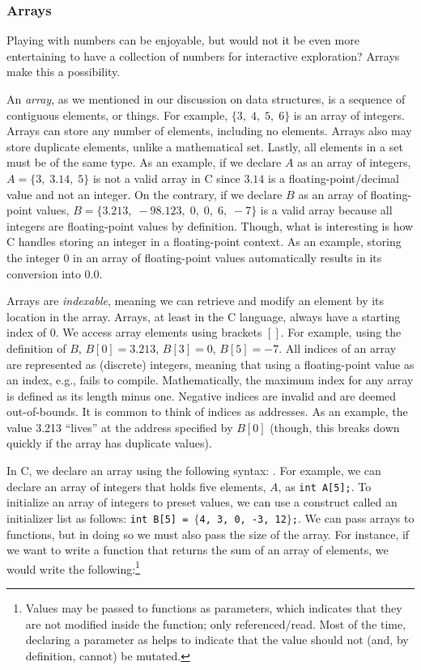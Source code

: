 \subsubsection*{Arrays}
Playing with numbers can be enjoyable, but would not it be even more entertaining to have a collection of numbers for interactive exploration? Arrays make this a possibility. 

An \textit{array}, as we mentioned in our discussion on data structures, is a sequence of contiguous elements, or things. For example, $\{3,\;4,\;5,\;6\}$ is an array of integers. Arrays can store any number of elements, including no elements. Arrays also may store duplicate elements, unlike a mathematical set. Lastly, all elements in a set must be of the same type. As an example, if we declare $A$ as an array of integers, $A=\{3,\;3.14,\;5\}$ is not a valid array in C since $3.14$ is a floating-point/decimal value and not an integer. On the contrary, if we declare $B$ as an array of floating-point values, $B=\{3.213,\;-98.123,\;0,\;0,\;6,\;-7\}$ is a valid array because all integers are floating-point values by definition. Though, what is interesting is how C handles storing an integer in a floating-point context. As an example, storing the integer $0$ in an array of floating-point values automatically results in its conversion into $0.0$. 

Arrays are \textit{indexable}, meaning we can retrieve and modify an element by its location in the array. Arrays, at least in the C language, always have a starting index of 0. We access array elements using brackets $[]$. For example, using the definition of $B$, $B[0]=3.213$, $B[3]=0$, $B[5]=-7$. All indices of an array are represented as (discrete) integers, meaning that using a floating-point value as an index, e.g.,  fails to compile. Mathematically, the maximum index for any array is defined as its length minus one. Negative indices are invalid and are deemed out-of-bounds. It is common to think of indices as addresses. As an example, the value 3.213 ``lives'' at the address specified by $B[0]$ (though, this breaks down quickly if the array has duplicate values). 

In C, we declare an array using the following syntax: . For example, we can declare an array of integers that holds five elements, $A$, as \texttt{int A[5];}. To initialize an array of integers to preset values, we can use a construct called an initializer list as follows: \texttt{int B[5] = $\{$4, 3, 0, -3, 12$\}$;}. We can pass arrays to functions, but in doing so we must also pass the size of the array. For instance, if we want to write a function that returns the sum of an array of  elements, we would write the following:\footnote{Values may be passed to functions as  parameters, which indicates that they are not modified inside the function; only referenced/read. Most of the time, declaring a parameter as  helps to indicate that the value should not (and, by definition, cannot) be mutated.}

